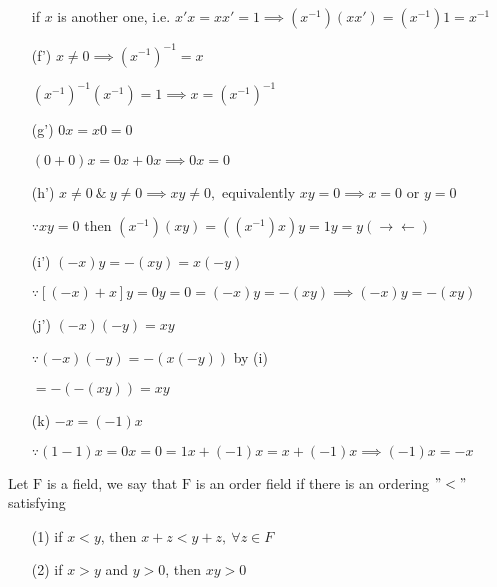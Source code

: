 \begin{enumerate}
	if $x$ is another one, i.e. $x'x = xx' = 1 \implies (x^{-1})(xx') = (x^{-1})1 = x^{-1}$
	
	\item[(f')]$x \neq 0 \implies (x^{-1})^{-1} = x$
	
	$(x^{-1})^{-1}(x^{-1}) = 1 \implies x = (x^{-1})^{-1}$
	
	\item[(g')]$0x = x0 = 0$
	
	$(0+0)x = 0x+0x \implies 0x = 0$
	
	\item[(h')] $x \neq 0 ~\&~ y\neq 0 \implies xy \neq 0,$ equivalently $xy =0 \implies x=0$ or $y = 0$
	
	$\because xy = 0$ then $(x^{-1})(xy) = ((x^{-1})x)y=1y=y (\rightarrow\leftarrow)$
	
	\item[(i')] $(-x)y = -(xy) = x(-y)$
	
	$\because [(-x)+x]y = 0y = 0 = (-x)y = -(xy) \implies (-x)y = -(xy)$
	
	\item[(j')] $(-x)(-y) = xy$
	
	$\because(-x)(-y) = -(x(-y))$ by (i)
	
	$= -(-(xy)) = xy$
	\item[(k)] $-x = (-1)x$
	
	$\because (1-1)x = 0x = 0 = 1x + (-1)x = x + (-1)x \implies (-1)x = -x$
\end{enumerate}


\begin{defn}
	Let $\mathrm{F}$ is a field, we say that $\mathrm{F}$ is an order field if there is an ordering $"<"$ satisfying
	
	\begin{enumerate}
		\item[(1)] if $x<y$, then $x+z < y+z ,~\forall z \in F$
		\item[(2)] if $x>y$ and $y>0$, then $xy >0$ 
	\end{enumerate}
\end{defn}

